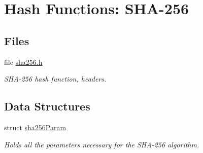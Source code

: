 \hypertarget{group__HASH__sha256__m}{
\section{Hash Functions: SHA-256}
\label{group__HASH__sha256__m}
}
\subsection*{Files}
\begin{CompactItemize}
\item 
file \hyperlink{sha256_8h}{sha256.h}
\begin{CompactList}\small\item\em SHA-256 hash function, headers. \item\end{CompactList}

\end{CompactItemize}
\subsection*{Data Structures}
\begin{CompactItemize}
\item 
struct \hyperlink{structsha256Param}{sha256Param}
\begin{CompactList}\small\item\em Holds all the parameters necessary for the SHA-256 algorithm. \item\end{CompactList}\end{CompactItemize}
